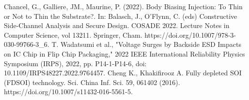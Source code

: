 \documentclass[10pt, conference, compsocconf]{IEEEtran}
\begin{document}
\begin{thebibliography}{1}
Chancel, G., Galliere, JM., Maurine, P. (2022). Body Biasing Injection: To Thin or Not to Thin the Substrate?. In: Balasch, J., O’Flynn, C. (eds) Constructive Side-Channel Analysis and Secure Design. COSADE 2022. Lecture Notes in Computer Science, vol 13211. Springer, Cham. https://doi.org/10.1007/978-3-030-99766-3\_6.
T. Wadatsumi et al., "Voltage Surges by Backside ESD Impacts on IC Chip in Flip Chip Packaging," 2022 IEEE International Reliability Physics Symposium (IRPS), 2022, pp. P14-1-P14-6, doi: 10.1109/IRPS48227.2022.9764457.
Cheng K., Khakifirooz A. Fully depleted SOI (FDSOI) technology. Sci. China Inf. Sci. 59, 061402 (2016). https://doi.org/10.1007/s11432-016-5561-5.
\end{thebibliography}
\end{document}
